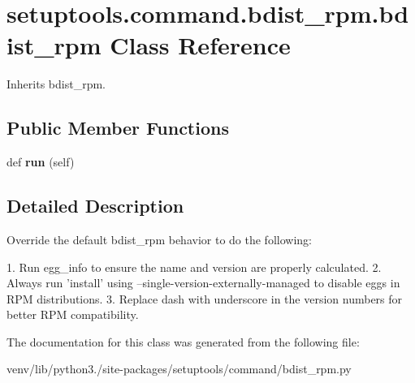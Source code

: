 \hypertarget{classsetuptools_1_1command_1_1bdist__rpm_1_1bdist__rpm}{}\section{setuptools.\+command.\+bdist\+\_\+rpm.\+bdist\+\_\+rpm Class Reference}
\label{classsetuptools_1_1command_1_1bdist__rpm_1_1bdist__rpm}


Inherits bdist\+\_\+rpm.

\subsection*{Public Member Functions}
\begin{DoxyCompactItemize}
\item 
\mbox{\label{classsetuptools_1_1command_1_1bdist__rpm_1_1bdist__rpm_af4bf74a4d1fcf5869be29590fd1b4287}} 
def {\bfseries run} (self)
\end{DoxyCompactItemize}


\subsection{Detailed Description}
\begin{DoxyVerb}Override the default bdist_rpm behavior to do the following:

1. Run egg_info to ensure the name and version are properly calculated.
2. Always run 'install' using --single-version-externally-managed to
   disable eggs in RPM distributions.
3. Replace dash with underscore in the version numbers for better RPM
   compatibility.
\end{DoxyVerb}
 

The documentation for this class was generated from the following file\+:\begin{DoxyCompactItemize}
\item 
venv/lib/python3./site-\/packages/setuptools/command/bdist\+\_\+rpm.\+py\end{DoxyCompactItemize}
